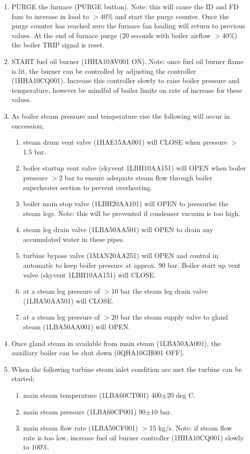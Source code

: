 \documentclass[10pt,a4paper]{article}
\begin{document}
\begin{enumerate}
\item PURGE the furnace (PURGE button). Note: this will cause the ID and FD fans to increase in load to $>$40\% and start the purge counter. Once the purge counter has reached zero the furnace fan loading will return to previous values. At the end of furnace purge (20 seconds with boiler airflow $>$40\%) the boiler TRIP signal is reset.
\item START fuel oil burner (1HHA10AV001 ON). Note: once fuel oil burner flame is lit, the burner can be controlled by adjusting the controller (1HHA10CQ001). Increase this controller slowly to raise boiler pressure and temperature, however be mindful of boiler limits on rate of increase for these values.
\item As boiler steam pressure and temperature rise the following will occur in succession;
\begin{enumerate}
\item steam drum vent valve (1HAE15AA001) will CLOSE when pressure $>$1.5 bar.
\item boiler startup vent valve (skyvent 1LBH10AA151) will OPEN when boiler pressure $>$2 bar to ensure adequate steam flow through boiler superheater section to prevent overheating.
\item boiler main stop valve (1LBH20AA101) will OPEN to pressurise the steam legs. Note: this will be prevented if condenser vacuum is too high.
\item steam leg drain valve (1LBA50AA501) will OPEN to drain any accumulated water in these pipes.
\item turbine bypass valve (1MAN20AA251) will OPEN and control in automatic to keep boiler pressure at approx. 90 bar. Boiler start up vent valve (skyvent 1LBH10AA151) will CLOSE.
\item at a steam leg pressure of $>$10 bar the steam leg drain valve (1LBA50AA501) will CLOSE.
\item at a steam leg pressure of $>$20 bar the steam supply valve to gland steam (1LBA50AA001) will OPEN.
\end{enumerate}
\item Once gland steam in available from main steam (1LBA50AA001), the auxiliary boiler can be shut down (0QHA10GH001 OFF).
\item When the following turbine steam inlet condition are met the turbine can be started;
\begin{enumerate}
\item main steam temperature (1LBA60CT001) 400$\pm$20 deg C.
\item main steam pressure (1LBA60CP001) 90$\pm10$ bar.
\item main steam flow rate (1LBA50CF001) $>$15 kg/s. Note: if steam flow rate is too low, increase fuel oil burner controller (1HHA10CQ001) slowly to 100\%. 
\end{enumerate}


\end{enumerate}
\end{document}
